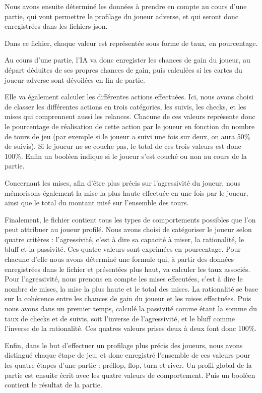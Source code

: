 \documentclass{report}
\begin{document}
Nous avons ensuite déterminé les données à prendre en compte au cours d'une partie, qui vont permettre le profilage du joueur adverse, et qui seront donc enregistrées dans les fichiers json.\par
Dans ce fichier, chaque valeur est représentée sous forme de taux, en pourcentage.\par
Au cours d'une partie, l'IA va donc enregister les chances de gain du joueur, au départ déduites de ses propres chances de gain, puis calculées si les cartes du joueur adverse sont dévoilées en fin de partie.\par
Elle va également calculer les différentes actions effectuées. Ici, nous avons choisi de classer les différentes actions en trois catégories, les suivis, les checks, et les mises qui comprennent aussi les relances. Chacune de ces valeurs représente donc le pourcentage de réalisation de cette action par le joueur en fonction du nombre de tours de jeu (par exemple si le joueur a suivi une fois sur deux, on aura 50\% de suivis). Si le joueur ne se couche pas, le total de ces trois valeurs est donc 100\%. Enfin un booléen indique si le joueur s'est couché ou non au cours de la partie.\par
Concernant les mises, afin d'être plus précis sur l'agressivité du joueur, nous mémorisons également la mise la plus haute effectuée en une fois par le joueur, ainsi que le total du montant misé sur l'ensemble des tours.\par
Finalement, le fichier contient tous les types de comportements possibles que l'on peut attribuer au joueur profilé. Nous avons choisi de catégoriser le joueur selon quatre critères : l'agressivité, c'est à dire sa capacité à miser, la rationalité, le bluff et la passivité. Ces quatre valeurs sont exprimées en pourcentage. Pour chacune d'elle nous avons déterminé une formule qui, à partir des données enregistrées dans le fichier et présentées plus haut, va calculer les taux associés. Pour l'agressivité, nous prenons en compte les mises effecutées, c'est à dire le nombre de mises, la mise la plus haute et le total des mises. La rationalité se base sur la cohérence entre les chances de gain du joueur et les mises effectuées. Puis nous avons dans un premier temps, calculé la passivité comme étant la somme du taux de checks et de suivis, soit l'inverse de l'agressivité, et le bluff comme l'inverse de la rationalité. Ces quatres valeurs prises deux à deux font donc 100\%.\par
Enfin, dans le but d'effectuer un profilage plus précis des joueurs, nous avons distingué chaque étape de jeu, et donc enregistré l'ensemble de ces valeurs pour les quatre étapes d'une partie : préflop, flop, turn et river. Un profil global de la partie est ensuite écrit avec les quatre valeurs de comportement. Puis un booléen contient le résultat de la partie.\\
\end{document}
